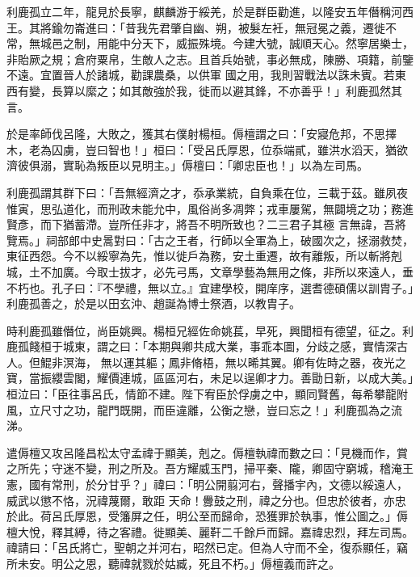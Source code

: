 \begin{pinyinscope}
 利鹿孤立二年，龍見於長寧，麒麟游于綏羌，於是群臣勸進，以隆安五年僭稱河西王。其將鍮勿崙進曰：「昔我先君肇自幽、朔，被髮左衽，無冠冕之義，遷徙不常，無城邑之制，用能中分天下，威振殊境。今建大號，誠順天心。然寧居樂士，非貽厥之規；倉府粟帛，生敵人之志。且首兵始號，事必無成，陳勝、項籍，前鑒不遠。宜置晉人於諸城，勸課農桑，以供軍
 國之用，我則習戰法以誅未賓。若東西有變，長算以縻之；如其敵強於我，徙而以避其鋒，不亦善乎！」利鹿孤然其言。



 於是率師伐呂隆，大敗之，獲其右僕射楊桓。傉檀謂之曰：「安寢危邦，不思擇木，老為囚虜，豈曰智也！」桓曰：「受呂氏厚恩，位忝端貳，雖洪水滔天，猶欲濟彼俱溺，實恥為叛臣以見明主。」傉檀曰：「卿忠臣也！」以為左司馬。



 利鹿孤謂其群下曰：「吾無經濟之才，忝承業統，自負乘在位，三載于茲。雖夙夜惟寅，思弘道化，而刑政未能允中，風俗尚多凋弊；戎車屢駕，無闢境之功；務進賢彥，而下猶蓄滯。豈所任非才，將吾不明所致也？二三君子其極
 言無諱，吾將覽焉。」祠部郎中史暠對曰：「古之王者，行師以全軍為上，破國次之，拯溺救焚，東征西怨。今不以綏寧為先，惟以徙戶為務，安土重遷，故有離叛，所以斬將剋城，土不加廣。今取士拔才，必先弓馬，文章學藝為無用之條，非所以來遠人，垂不朽也。孔子曰：『不學禮，無以立。』宜建學校，開庠序，選耆德碩儒以訓胄子。」利鹿孤善之，於是以田玄沖、趙誕為博士祭酒，以教胄子。



 時利鹿孤雖僭位，尚臣姚興。楊桓兄經佐命姚萇，早死，興聞桓有德望，征之。利鹿孤餞桓于城東，謂之曰：「本期與卿共成大業，事乖本圖，分歧之感，實情深古人。但鯤非溟海，
 無以運其軀；鳳非脩梧，無以晞其翼。卿有佐時之器，夜光之寶，當振纓雲閣，耀價連城，區區河右，未足以逞卿才力。善勖日新，以成大美。」桓泣曰：「臣往事呂氏，情節不建。陛下宥臣於俘虜之中，顯同賢舊，每希攀龍附風，立尺寸之功，龍門既開，而臣違離，公衡之戀，豈曰忘之！」利鹿孤為之流涕。



 遣傉檀又攻呂隆昌松太守孟禕于顯美，剋之。傉檀執禕而數之曰：「見機而作，賞之所先；守迷不變，刑之所及。吾方耀威玉門，掃平秦、隴，卿固守窮城，稽淹王憲，國有常刑，於分甘乎？」禕曰：「明公開翦河右，聲播宇內，文德以綏遠人，威武以懲不恪，況禕蔑爾，敢距
 天命！釁鼓之刑，禕之分也。但忠於彼者，亦忠於此。荷呂氏厚恩，受籓屏之任，明公至而歸命，恐獲罪於執事，惟公圖之。」傉檀大悅，釋其縛，待之客禮。徙顯美、麗靬二千餘戶而歸。嘉禕忠烈，拜左司馬。禕請曰：「呂氏將亡，聖朝之并河右，昭然已定。但為人守而不全，復忝顯任，竊所未安。明公之恩，聽禕就戮於姑臧，死且不朽。」傉檀義而許之。




\end{pinyinscope}
